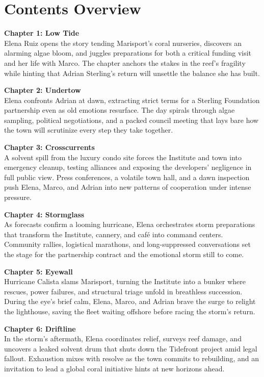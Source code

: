 \chapter*{Contents Overview}

\noindent\textbf{Chapter 1: Low Tide}\\
Elena Ruiz opens the story tending Marisport's coral nurseries, discovers an alarming algae bloom, and juggles preparations for both a critical funding visit and her life with Marco. The chapter anchors the stakes in the reef's fragility while hinting that Adrian Sterling's return will unsettle the balance she has built.

\medskip

\noindent\textbf{Chapter 2: Undertow}\\
Elena confronts Adrian at dawn, extracting strict terms for a Sterling Foundation partnership even as old emotions resurface. The day spirals through algae sampling, political negotiations, and a packed council meeting that lays bare how the town will scrutinize every step they take together.

\medskip

\noindent\textbf{Chapter 3: Crosscurrents}\\
A solvent spill from the luxury condo site forces the Institute and town into emergency cleanup, testing alliances and exposing the developers' negligence in full public view. Press conferences, a volatile town hall, and a dawn inspection push Elena, Marco, and Adrian into new patterns of cooperation under intense pressure.

\medskip

\noindent\textbf{Chapter 4: Stormglass}\\
As forecasts confirm a looming hurricane, Elena orchestrates storm preparations that transform the Institute, cannery, and café into command centers. Community rallies, logistical marathons, and long-suppressed conversations set the stage for the partnership contract and the emotional storm still to come.

\medskip

\noindent\textbf{Chapter 5: Eyewall}\\
Hurricane Calista slams Marisport, turning the Institute into a bunker where rescues, power failures, and structural triage unfold in breathless succession. During the eye's brief calm, Elena, Marco, and Adrian brave the surge to relight the lighthouse, saving the fleet waiting offshore before racing the storm's return.

\medskip

\noindent\textbf{Chapter 6: Driftline}\\
In the storm's aftermath, Elena coordinates relief, surveys reef damage, and uncovers a leaked solvent drum that shuts down the Tidefront project amid legal fallout. Exhaustion mixes with resolve as the town commits to rebuilding, and an invitation to lead a global coral initiative hints at new horizons ahead.
